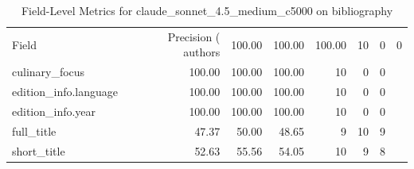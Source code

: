 \begin{table}
\caption{Field-Level Metrics for claude_sonnet_4.5_medium_c5000 on bibliography}
\label{tab:fields_claude_sonnet_4.5_medium_c5000_bibliography}
\begin{tabular}{lrrrrrr}
\toprule
Field & Precision (%
\midrule
authors & 100.00 & 100.00 & 100.00 & 10 & 0 & 0 \\
culinary_focus & 100.00 & 100.00 & 100.00 & 10 & 0 & 0 \\
edition_info.language & 100.00 & 100.00 & 100.00 & 10 & 0 & 0 \\
edition_info.year & 100.00 & 100.00 & 100.00 & 10 & 0 & 0 \\
full_title & 47.37 & 50.00 & 48.65 & 9 & 10 & 9 \\
short_title & 52.63 & 55.56 & 54.05 & 10 & 9 & 8 \\
\bottomrule
\end{tabular}
\end{table}
